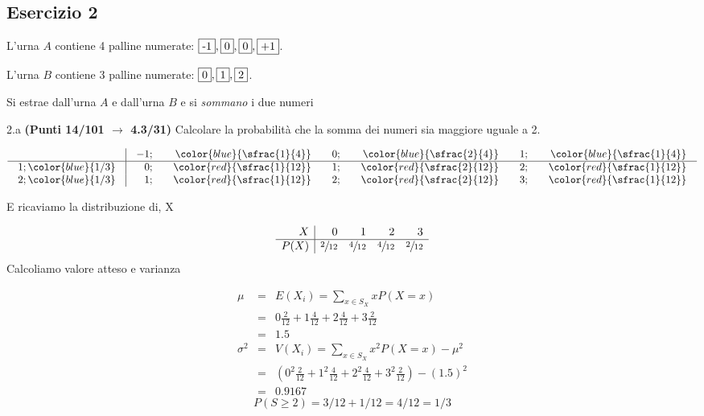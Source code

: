 \documentclass[
  11pt,
]{book}
\theoremstyle{mytheoremstyle}
\theoremstyle{mydefstyle}
\newenvironment{sol}
  {
  \begin{tcolorbox}[enhanced,breakable,arc=0.1mm,boxrule=1pt,colback=white,colframe=iblue,
  title=\bf \fontfamily{lmss}\selectfont \hspace{.5 cm} Soluzione,drop fuzzy shadow]

}{
\end{tcolorbox}
  }
\begin{document}
\subsection{Esercizio 2}\label{esercizio-2-6}

L'urna \(A\) contiene 4 palline numerate: \(\fbox{-1},\fbox{0},\fbox{0},\fbox{+1}\).

L'urna \(B\) contiene 3 palline numerate: \(\fbox{0},\fbox{1},\fbox{2}\).

Si estrae dall'urna \(A\) e dall'urna \(B\) e si \emph{sommano} i due numeri

2.a \textbf{(Punti 14/101 \(\rightarrow\) 4.3/31)} Calcolare la probabilità che la somma dei numeri sia maggiore uguale a 2.

\begin{sol}

\normalsize

\[\arraycolsep=10pt\def\arraystretch{1}\begin{array}{ r|rrrrrr }
& -1 ;&\color{blue}{ \sfrac{ 1 } { 4 }} & 0 ;&\color{blue}{ \sfrac{ 2 } { 4 }} & 1 ;&\color{blue}{ \sfrac{ 1 } { 4 }} \\ 
\hline 
1 ;\color{blue}{ 1 / 3 }& 0;&\color{red}{\sfrac{1}{12}}& 1;&\color{red}{\sfrac{2}{12}}& 2;&\color{red}{\sfrac{1}{12}}\\ 
2 ;\color{blue}{ 1 / 3 }& 1;&\color{red}{\sfrac{1}{12}}& 2;&\color{red}{\sfrac{2}{12}}& 3;&\color{red}{\sfrac{1}{12}}\\ 
\end{array}
 \]

\normalsize E ricaviamo la distribuzione di, X

\normalsize

\[
     \begin{array}{ r|rrrr }
 X  & 0& 1& 2& 3 \\ 
 \hline 
 P( X ) & \sfrac{2}{12}& \sfrac{4}{12}& \sfrac{4}{12}& \sfrac{2}{12} \\ 
 \end{array}
 \]
\normalsize Calcoliamo valore atteso e varianza

\normalsize

\begin{eqnarray*} \mu &=& E(X_i) = \sum_{x\in S_X}x P(X=x)\\ 
 &=&  0  \frac { 2 }{ 12 }+ 1  \frac { 4 }{ 12 }+ 2  \frac { 4 }{ 12 }+ 3  \frac { 2 }{ 12 } \\ 
            &=& 1.5 \\ 
 \sigma^2 &=& V(X_i) = \sum_{x\in S_X}x^2 P(X=x)-\mu^2\\ 
 &=&\left(  0  ^2\frac { 2 }{ 12 }+ 1  ^2\frac { 4 }{ 12 }+ 2  ^2\frac { 4 }{ 12 }+ 3  ^2\frac { 2 }{ 12 } \right)-( 1.5 )^2\\ 
            &=& 0.9167 
\end{eqnarray*}
\normalsize
\[
P(S\ge 2)=3/12+1/12=4/12=1/3
\]

\end{sol}
\end{document}
